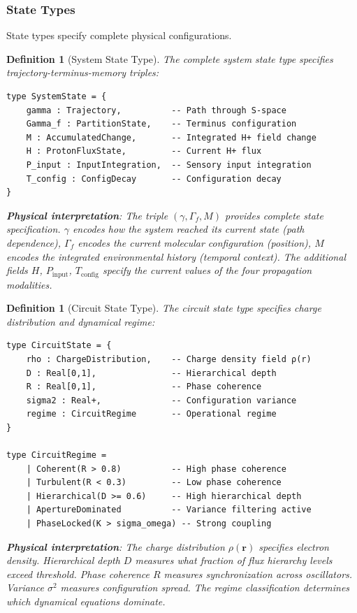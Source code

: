 \documentclass[aps,prd,twocolumn,superscriptaddress,floatfix,nofootinbib]{revtex4-2}
\newtheorem{definition}[theorem]{Definition}
\theoremstyle{remark}
\begin{document}
\subsubsection{State Types}

State types specify complete physical configurations.

\begin{definition}[System State Type]
\label{def:system_state_type}
The complete system state type specifies trajectory-terminus-memory triples:
\begin{verbatim}
type SystemState = {
    gamma : Trajectory,          -- Path through S-space
    Gamma_f : PartitionState,    -- Terminus configuration
    M : AccumulatedChange,       -- Integrated H+ field change
    H : ProtonFluxState,         -- Current H+ flux
    P_input : InputIntegration,  -- Sensory input integration
    T_config : ConfigDecay       -- Configuration decay
}
\end{verbatim}

\textbf{Physical interpretation}: The triple $(\gamma, \Gamma_f, M)$ provides complete state specification. $\gamma$ encodes how the system reached its current state (path dependence), $\Gamma_f$ encodes the current molecular configuration (position), $M$ encodes the integrated environmental history (temporal context). The additional fields $H$, $P_{\text{input}}$, $T_{\text{config}}$ specify the current values of the four propagation modalities.
\end{definition}

\begin{definition}[Circuit State Type]
\label{def:circuit_state_type}
The circuit state type specifies charge distribution and dynamical regime:
\begin{verbatim}
type CircuitState = {
    rho : ChargeDistribution,    -- Charge density field ρ(r)
    D : Real[0,1],               -- Hierarchical depth
    R : Real[0,1],               -- Phase coherence
    sigma2 : Real+,              -- Configuration variance
    regime : CircuitRegime       -- Operational regime
}

type CircuitRegime =
    | Coherent(R > 0.8)          -- High phase coherence
    | Turbulent(R < 0.3)         -- Low phase coherence
    | Hierarchical(D >= 0.6)     -- High hierarchical depth
    | ApertureDominated          -- Variance filtering active
    | PhaseLocked(K > sigma_omega) -- Strong coupling
\end{verbatim}

\textbf{Physical interpretation}: The charge distribution $\rho(\mathbf{r})$ specifies electron density. Hierarchical depth $D$ measures what fraction of flux hierarchy levels exceed threshold. Phase coherence $R$ measures synchronization across oscillators. Variance $\sigma^2$ measures configuration spread. The regime classification determines which dynamical equations dominate.
\end{definition}
\end{document}
